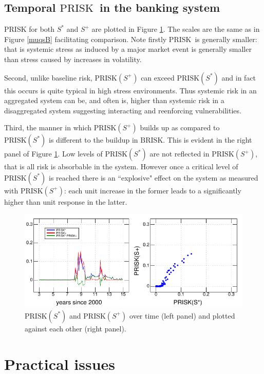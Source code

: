\documentclass[authoryear]{elsarticle}
\newcommand{\fref}[1]{Figure \ref{#1}}
\newcommand{\br}{\ensuremath{\mathrm{BRISK}}}
\newcommand{\pr}{\ensuremath{\mathrm{PRISK}}}
\begin{document}
\subsection{Temporal \pr\  in the banking system}\label{Paggregate}

PRISK for both $S^*$ and $S^+$ are plotted in \fref{muqsP}.  The scales are the same as in \fref{muqsB} facilitating comparison.   Note firstly \pr\ is generally smaller: that is systemic stress as induced by a major market event is generally smaller than stress caused by increases in volatility.   

Second, unlike baseline risk,   $\pr(S^+)$ can exceed $\pr(S^*)$ and in fact this occurs is quite typical in high stress environments.   Thus systemic risk in an aggregated system can be, and often is, higher than systemic risk in a disaggregated system suggesting interacting and reenforcing vulnerabilities. 

Third, the manner in which $\pr(S^+)$ builds up as compared to $\pr(S^*)$ is different to the buildup in \br.   This is evident in the right panel of \fref{muqsP}.  Low levels of $\pr(S^*)$ are not reflected in $\pr(S^+)$, that is all risk is absorbable in the system.   However once a critical level of $\pr(S^*)$ is reached there is an ``explosive" effect on the system as measured with $\pr(S^+)$: each unit increase in the former leads to a significantly higher than unit response in the latter.    

\begin{figure}[htbp]
\begin{center}
\includegraphics[width=12cm]{figures/muqsP.pdf}
\caption{$\pr(S^*)$ and $\pr(S^+)$ over time (left panel) and plotted against each other (right panel).}\label{muqsP}
\end{center}
\end{figure}




\section{Practical issues}\label{s_concl}
\end{document}
